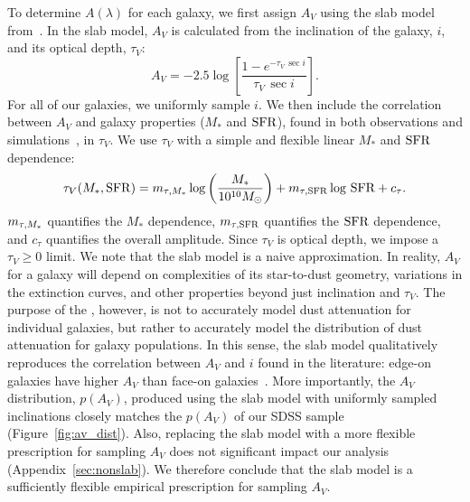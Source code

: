 To determine $A(\lambda)$ for each galaxy, we first assign $A_V$ using the slab
model from~\cite{somerville1999, somerville2012}. In the slab model, $A_V$ is
calculated from the inclination of the galaxy, $i$, and its optical depth, $\tau_V$: 
\begin{equation} \label{eq:slab}
    A_V = -2.5 \log \left[ \frac{1 - e^{-\tau_V\,\sec i}}{\tau_V\,\sec i} \right].
\end{equation}
For all of our galaxies, we uniformly sample $i$. We then include the
correlation between $A_V$ and galaxy properties ($M_*$ and ${\rm SFR}$), found
in both observations and simulations~\citep[\eg][]{narayanan2018, salim2020},
in $\tau_V$. We use $\tau_V$ with a simple and flexible linear $M_*$ and ${\rm SFR}$ 
dependence:
\begin{equation} \label{eq:tauv}
    \tau_V(M_*, {\rm SFR}) = m_{\tau,M_*} \log \left(\frac{M_*}{10^{10} M_\odot}\right) + m_{\tau,{\rm SFR}} \log\,{\rm SFR} + c_\tau.
\end{equation}
$m_{\tau,M_*}$ quantifies the $M_*$ dependence, $m_{\tau,{\rm SFR}}$ quantifies the ${\rm SFR}$
dependence, and $c_\tau$ quantifies the overall amplitude. Since $\tau_V$ is
optical depth, we impose a $\tau_V \ge 0$ limit. We note that the slab model 
is a naive approximation. In reality, $A_V$ for a galaxy will depend on complexities 
of its star-to-dust geometry, variations in the extinction curves, and other
properties beyond just inclination and $\tau_V$. The purpose of the \eda,
however, is not to accurately model dust attenuation for individual galaxies,
but rather to accurately model the distribution of dust attenuation for galaxy
populations. In this sense, the slab model qualitatively reproduces the
correlation between $A_V$ and $i$ found in the literature: edge-on galaxies
have higher $A_V$ than face-on galaxies~\citep[\eg][]{conroy2010, wild2011,
battisti2017, salim2020}. More
importantly, the $A_V$ distribution, $p(A_V)$, produced using the slab model with
uniformly sampled inclinations closely matches the $p(A_V)$ of our SDSS sample
(Figure~\ref{fig:av_dist}). Also, replacing the slab model with a more flexible
prescription for sampling $A_V$ does not significant
impact our analysis (Appendix~\ref{sec:nonslab}). We therefore conclude that
the slab model is a sufficiently flexible empirical prescription for sampling
$A_V$. 

